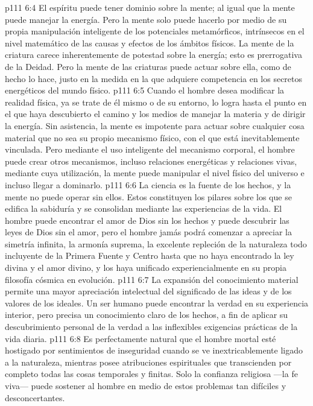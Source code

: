 \vs p111 6:4 \pc El espíritu puede tener dominio sobre la mente; al igual que la mente puede manejar la energía. Pero la mente solo puede hacerlo por medio de su propia manipulación inteligente de los potenciales metamórficos, intrínsecos en el nivel matemático de las causas y efectos de los ámbitos físicos. La mente de la criatura carece inherentemente de potestad sobre la energía; esto es prerrogativa de la Deidad. Pero la mente de las criaturas puede actuar sobre ella, como de hecho lo hace, justo en la medida en la que adquiere competencia en los secretos energéticos del mundo físico.
\vs p111 6:5 Cuando el hombre desea modificar la realidad física, ya se trate de él mismo o de su entorno, lo logra hasta el punto en el que haya descubierto el camino y los medios de manejar la materia y de dirigir la energía. Sin asistencia, la mente es impotente para actuar sobre cualquier cosa material que no sea su propio mecanismo físico, con el que está inevitablemente vinculada. Pero mediante el uso inteligente del mecanismo corporal, el hombre puede crear otros mecanismos, incluso relaciones energéticas y relaciones vivas, mediante cuya utilización, la mente puede manipular el nivel físico del universo e incluso llegar a dominarlo.
\vs p111 6:6 La ciencia es la fuente de los hechos, y la mente no puede operar sin ellos. Estos constituyen los pilares sobre los que se edifica la sabiduría y se consolidan mediante las experiencias de la vida. El hombre puede encontrar el amor de Dios sin los hechos y puede descubrir las leyes de Dios sin el amor, pero el hombre jamás podrá comenzar a apreciar la simetría infinita, la armonía suprema, la excelente repleción de la naturaleza todo incluyente de la Primera Fuente y Centro hasta que no haya encontrado la ley divina y el amor divino, y los haya unificado experiencialmente en su propia filosofía cósmica en evolución.
\vs p111 6:7 La expansión del conocimiento material permite una mayor apreciación intelectual del significado de las ideas y de los valores de los ideales. Un ser humano puede encontrar la verdad en su experiencia interior, pero precisa un conocimiento claro de los hechos, a fin de aplicar su descubrimiento personal de la verdad a las inflexibles exigencias prácticas de la vida diaria.
\vs p111 6:8 \pc Es perfectamente natural que el hombre mortal esté hostigado por sentimientos de inseguridad cuando se ve inextricablemente ligado a la naturaleza, mientras posee atribuciones espirituales que transcienden por completo todas las cosas temporales y finitas. Solo la confianza religiosa ---la fe viva--- puede sostener al hombre en medio de estos problemas tan difíciles y desconcertantes.
